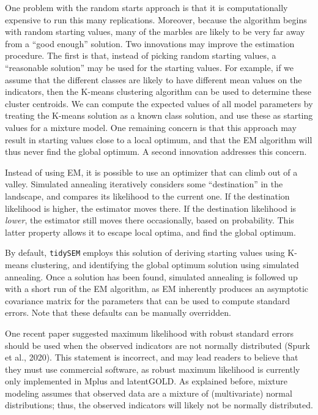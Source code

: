 \documentclass[
  ,man]{apa6}
\begin{document}
One problem with the random starts approach is that
it is computationally expensive to run this many replications.
Moreover, because the algorithm begins with random starting values,
many of the marbles are likely to be very far away from a ``good enough'' solution.
Two innovations may improve the estimation procedure.
The first is that, instead of picking random starting values,
a ``reasonable solution'' may be used for the starting values.
For example, if we assume that the different classes are likely to have different mean values on the indicators,
then the K-means clustering algorithm can be used to determine these cluster centroids.
We can compute the expected values of all model parameters by treating the K-means solution as a known class solution,
and use these as starting values for a mixture model.
One remaining concern is that this approach may result in starting values close to a local optimum,
and that the EM algorithm will thus never find the global optimum.
A second innovation addresses this concern.

Instead of using EM, it is possible to use an optimizer that can climb out of a valley.
Simulated annealing iteratively considers some ``destination'' in the landscape,
and compares its likelihood to the current one. If the destination likelihood is higher,
the estimator moves there.
If the destination likelihood is \emph{lower}, the estimator still moves there occasionally, based on probability.
This latter property allows it to escape local optima, and find the global optimum.

By default, \texttt{tidySEM} employs this solution of deriving starting values using K-means clustering,
and identifying the global optimum solution using simulated annealing.
Once a solution has been found,
simulated annealing is followed up with a short run of the EM algorithm,
as EM inherently produces an asymptotic covariance matrix for the parameters that can be used to compute standard errors.
Note that these defaults can be manually overridden.

One recent paper suggested maximum likelihood with robust standard errors should be used when the observed indicators are not normally distributed (Spurk et al., 2020).
This statement is incorrect, and may lead readers to believe that they must use commercial software, as robust maximum likelihood is currently only implemented in Mplus and latentGOLD.
As explained before, mixture modeling assumes that observed data are a mixture of (multivariate) normal distributions; thus, the observed indicators will likely not be normally distributed.
\end{document}
